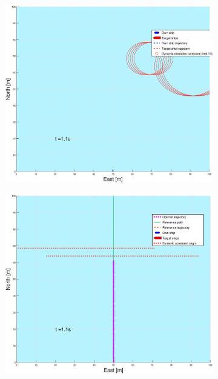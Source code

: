 \begin{figure}[!b]
\begin{subfigure}[b]{0.499\textwidth}
    \end{subfigure}
    \hfill
    \\
    \begin{subfigure}[b]{0.49\textwidth}
        \centering
        \includegraphics[width=\textwidth]{Images/Figures/enkel_GW/_Simple_1fig1_time=1}
    \end{subfigure}
    \hfill
    \begin{subfigure}[b]{0.499\textwidth}
        \centering
        \includegraphics[width=\textwidth]{Images/Figures/enkel_GW/_Simple_1fig999_time=1}

\end{subfigure}
\end{figure}
